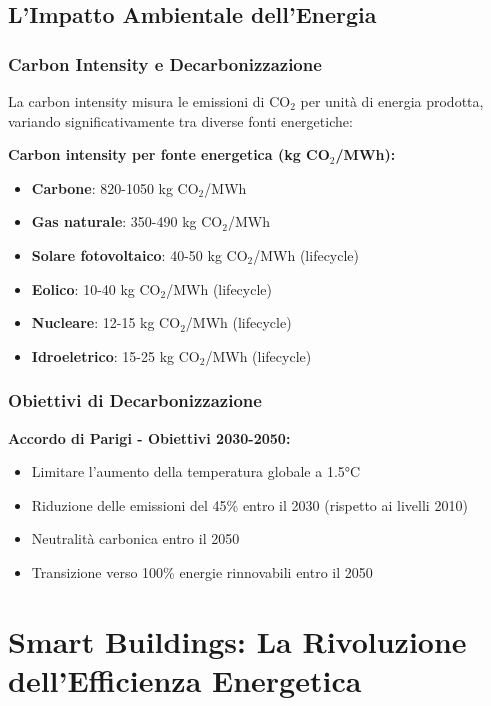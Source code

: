 \documentclass[12pt,a4paper,twoside]{report}
\begin{document}
\subsection{L'Impatto Ambientale dell'Energia}

\subsubsection{Carbon Intensity e Decarbonizzazione}

La carbon intensity misura le emissioni di CO$_2$ per unità di energia prodotta, variando significativamente tra diverse fonti energetiche:

\textbf{Carbon intensity per fonte energetica (kg CO$_2$/MWh):}
\begin{itemize}
    \item \textbf{Carbone}: 820-1050 kg CO$_2$/MWh
    \item \textbf{Gas naturale}: 350-490 kg CO$_2$/MWh
    \item \textbf{Solare fotovoltaico}: 40-50 kg CO$_2$/MWh (lifecycle)
    \item \textbf{Eolico}: 10-40 kg CO$_2$/MWh (lifecycle)
    \item \textbf{Nucleare}: 12-15 kg CO$_2$/MWh (lifecycle)
    \item \textbf{Idroeletrico}: 15-25 kg CO$_2$/MWh (lifecycle)
\end{itemize}

\subsubsection{Obiettivi di Decarbonizzazione}

\textbf{Accordo di Parigi - Obiettivi 2030-2050:}
\begin{itemize}
    \item Limitare l'aumento della temperatura globale a 1.5°C
    \item Riduzione delle emissioni del 45\% entro il 2030 (rispetto ai livelli 2010)
    \item Neutralità carbonica entro il 2050
    \item Transizione verso 100\% energie rinnovabili entro il 2050
\end{itemize}

\section{Smart Buildings: La Rivoluzione dell'Efficienza Energetica}
\end{document}
